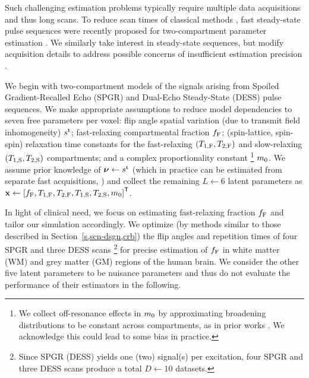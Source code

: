 Such challenging estimation problems
typically require multiple data acquisitions
and thus long scans.
To reduce scan times
of classical methods
\cite{mackay:94:ivv},
fast steady-state pulse sequences
were recently proposed 
for two-compartment parameter estimation
\cite{deoni:08:gmt, deoni:11:com}.
We similarly take interest
in steady-state sequences,
but modify acquisition details
to address possible concerns
of insufficient estimation precision
\cite{lankford:13:oti}.

We begin with two-compartment models
of the signals arising from
Spoiled Gradient-Recalled Echo (SPGR)
\cite{zur:91:sot}
and Dual-Echo Steady-State (DESS) 
\cite{bruder:88:ans}
pulse sequences.
We make appropriate assumptions 
to reduce model dependencies
to seven free parameters per voxel:
flip angle spatial variation 
(due to transmit field inhomogeneity) $s^{\mathrm{t}}$;
fast-relaxing compartmental fraction $f_{\mathrm{F}}$;
(spin-lattice, spin-spin) relaxation time constants 
for the fast-relaxing $\paren{\tf{1},\tf{2}}$
and slow-relaxing $\paren{\ts{1},\ts{2}}$ compartments;
and a complex proportionality constant
\footnote{We collect off-resonance effects in $m_0$
by approximating broadening distributions
to be constant across compartments,
as in prior works \cite{deoni:08:gmt, deoni:11:com}.
We acknowledge this could lead to some bias in practice.}
$m_0$.
We assume prior knowledge of $\boldsymbol{\nu} \gets s^{\mathrm{t}}$ 
(which in practice can be estimated
from separate fast acquisitions, 
\eg \cite{sacolick:10:bmb})
and collect the remaining $L \gets 6$ latent parameters as
$\bmx \gets \brac{\ff,\tf{1},\tf{2},\ts{1},\ts{2},\mzero}\tpose$.

In light of clinical need,
we focus on estimating fast-relaxing fraction $f_{\mathrm{F}}$
and tailor our simulation accordingly.
We optimize 
(by methods similar to those described in Section~\ref{s,scn-dsgn,crb})
the flip angles and repetition times
of four SPGR and three DESS scans
\footnote{Since SPGR (DESS) yields one (two) signal(s) per excitation,
four SPGR and three DESS scans produce a total $D \gets 10$ datasets.}
for precise estimation of $f_{\mathrm{F}}$ 
in white matter (WM) 
and grey matter (GM) regions 
of the human brain.
We consider the other five latent parameters
to be nuisance parameters
and thus do not evaluate the performance of their estimators
in the following.

